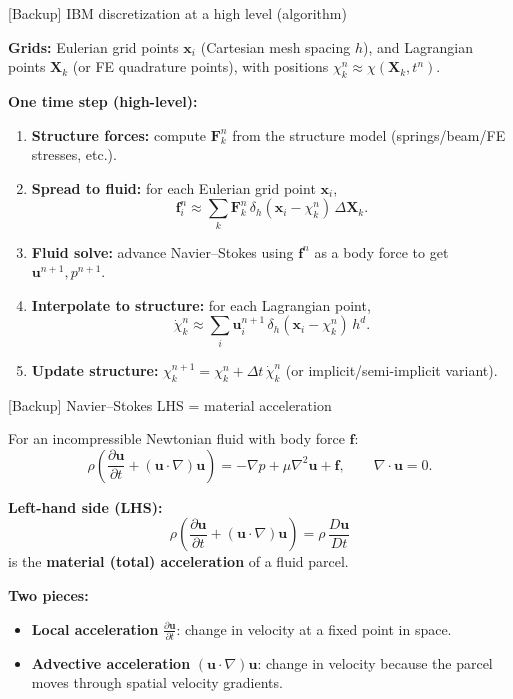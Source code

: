 \documentclass{beamer}
\begin{document}
\begin{frame}{[Backup] IBM discretization at a high level (algorithm)}
\footnotesize

\textbf{Grids:}
Eulerian grid points $\mathbf{x}_{i}$ (Cartesian mesh spacing $h$), and Lagrangian points $\mathbf{X}_k$
(or FE quadrature points), with positions $\chi_k^n\approx \chi(\mathbf{X}_k,t^n)$.

\medskip
\textbf{One time step (high-level):}
\begin{enumerate}\itemsep3pt
\item \textbf{Structure forces:} compute $\mathbf{F}_k^n$ from the structure model (springs/beam/FE stresses, etc.).
\item \textbf{Spread to fluid:} for each Eulerian grid point $\mathbf{x}_i$,
\[
\mathbf{f}_i^n \approx \sum_k \mathbf{F}_k^n\,\delta_h(\mathbf{x}_i-\chi_k^n)\,\Delta \mathbf{X}_k.
\]
\item \textbf{Fluid solve:} advance Navier--Stokes using $\mathbf{f}^n$ as a body force to get $\mathbf{u}^{n+1},p^{n+1}$.
\item \textbf{Interpolate to structure:} for each Lagrangian point,
\[
\dot{\chi}_k^{n} \approx \sum_i \mathbf{u}_i^{n+1}\,\delta_h(\mathbf{x}_i-\chi_k^{n})\,h^d.
\]
\item \textbf{Update structure:} $\chi_k^{n+1}=\chi_k^{n}+\Delta t\,\dot{\chi}_k^{n}$ (or implicit/semi-implicit variant).
\end{enumerate}

\end{frame}



\begin{frame}{[Backup] Navier--Stokes LHS = material acceleration}
\footnotesize

For an incompressible Newtonian fluid with body force $\mathbf{f}$:
\[
\rho\left(\frac{\partial \mathbf{u}}{\partial t} + (\mathbf{u}\cdot\nabla)\mathbf{u}\right)
=
-\nabla p + \mu\nabla^2\mathbf{u} + \mathbf{f},
\qquad \nabla\cdot\mathbf{u}=0.
\]

\medskip
\textbf{Left-hand side (LHS):}
\[
\boxed{
\rho\left(\frac{\partial \mathbf{u}}{\partial t} + (\mathbf{u}\cdot\nabla)\mathbf{u}\right)
=
\rho\,\frac{D\mathbf{u}}{Dt}
}
\]
is the \textbf{material (total) acceleration} of a fluid parcel.

\medskip
\textbf{Two pieces:}
\begin{itemize}\itemsep3pt
\item \textbf{Local acceleration} $\displaystyle \frac{\partial \mathbf{u}}{\partial t}$:
change in velocity at a fixed point in space.
\item \textbf{Advective acceleration} $\displaystyle (\mathbf{u}\cdot\nabla)\mathbf{u}$:
change in velocity because the parcel moves through spatial velocity gradients.
\end{itemize}

\end{frame}
\end{document}
